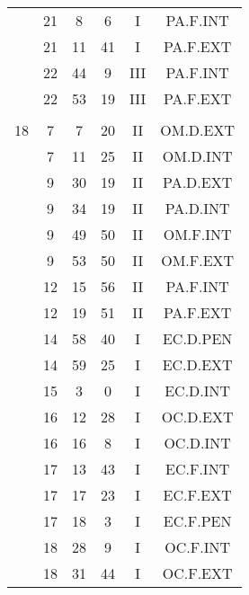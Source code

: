 \documentclass[12pt, a4paper]{article}
\begin{document}
\begin{multicols}{3}
{\begin{tabular}{c c c c c c}
	 	 	 	 & 21 & 8 & 6 & I & PA.F.INT\\%
	 	 	 	 & 21 & 11 & 41 & I & PA.F.EXT\\%
	 	 	 	 & 22 & 44 & 9 & III & PA.F.INT\\%
	 	 	 	 & 22 & 53 & 19 & III & PA.F.EXT\\%
	 	 	 	 & & & & & \\%
	 	 	 	18 & 7 & 7 & 20 & II & OM.D.EXT\\%
	 	 	 	 & 7 & 11 & 25 & II & OM.D.INT\\%
	 	 	 	 & 9 & 30 & 19 & II & PA.D.EXT\\%
	 	 	 	 & 9 & 34 & 19 & II & PA.D.INT\\%
	 	 	 	 & 9 & 49 & 50 & II & OM.F.INT\\%
	 	 	 	 & 9 & 53 & 50 & II & OM.F.EXT\\%
	 	 	 	 & 12 & 15 & 56 & II & PA.F.INT\\%
	 	 	 	 & 12 & 19 & 51 & II & PA.F.EXT\\%
	 	 	 	 & 14 & 58 & 40 & I & EC.D.PEN\\%
	 	 	 	 & 14 & 59 & 25 & I & EC.D.EXT\\%
	 	 	 	 & 15 & 3 & 0 & I & EC.D.INT\\%
	 	 	 	 & 16 & 12 & 28 & I & OC.D.EXT\\%
	 	 	 	 & 16 & 16 & 8 & I & OC.D.INT\\%
	 	 	 	 & 17 & 13 & 43 & I & EC.F.INT\\%
	 	 	 	 & 17 & 17 & 23 & I & EC.F.EXT\\%
	 	 	 	 & 17 & 18 & 3 & I & EC.F.PEN\\%
	 	 	 	 & 18 & 28 & 9 & I & OC.F.INT\\%
	 	 	 	 & 18 & 31 & 44 & I & OC.F.EXT\\%

\end{tabular}}
\end{multicols}
\end{document}

